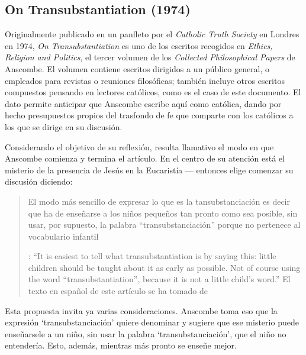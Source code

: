 \subsection{On Transubstantiation (1974)}

Originalmente publicado en un panfleto por el \emph{Catholic Truth Society} en Londres en 1974, \emph{On Transubstantiation} es uno de los escritos recogidos en \emph{Ethics, Religion and Politics}, el tercer volumen de los \emph{Collected Philosophical Papers} de Anscombe. El volumen contiene escritos dirigidos a un público general, o empleados para revistas o reuniones filosóficas; también incluye otros escritos compuestos pensando en lectores católicos, como es el caso de este documento. El dato permite anticipar que Anscombe escribe aquí como católica, dando por hecho presupuestos propios del trasfondo de fe que comparte con los católicos a los que se dirige en su discusión.

Considerando el objetivo de su reflexión, resulta llamativo el modo en que Anscombe comienza y termina el artículo. En el centro de su atención está el misterio de la presencia de Jesús en la Eucaristía --- entonces elige comenzar su discusión diciendo: \blockquote[{\cite[108]{anscombe1981erp:ot}}: \enquote{It is easiest to tell what transubstantiation is by saying this: little children should be taught about it as early as possible. Not of course using the word ``transubstantiation'', because it is not a little child's word.} El texto en español de este artículo se ha tomado de {\cite{torralbaynubiola2005fayeh:ot}}]{El modo más sencillo de expresar lo que es la tansubstanciación es decir que ha de enseñarse a los niños pequeños tan pronto como sea posible, sin usar, por supuesto, la palabra ``transubstanciación'' porque no pertenece al vocabulario infantil}. Esta propuesta invita ya varias consideraciones. Anscombe toma eso que la expresión `transubstanciación' quiere denominar y sugiere que ese misterio puede enseñarsele a un niño, sin usar la palabra `transubstanciación', que el niño no entendería. Esto, además, mientras más pronto se enseñe mejor.

